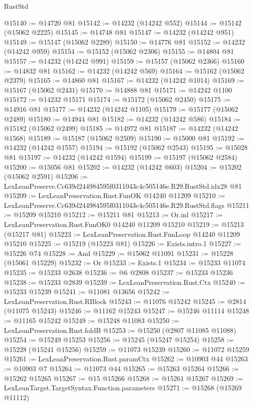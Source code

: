 \begin{lexlean}{RustStd}
\begin{coremodule}
@15140 := @14720 @81
@15142 := @14232 (@14242 @552)
@15144 := @15142 (@15062 @2225)
@15145 := @14748 @81
@15147 := @14232 (@14242 @951)
@15149 := @15147 (@15062 @2289)
@15150 := @14776 @81
@15152 := @14232 (@14242 @959)
@15154 := @15152 (@15062 @2306)
@15155 := @14804 @81
@15157 := @14232 (@14242 @991)
@15159 := @15157 (@15062 @2366)
@15160 := @14832 @81
@15162 := @14232 (@14242 @569)
@15164 := @15162 (@15062 @2379)
@15165 := @14860 @81
@15167 := @14232 (@14242 @1014)
@15169 := @15167 (@15062 @2431)
@15170 := @14888 @81
@15171 := @14242 @1100
@15172 := @14232 @15171
@15174 := @15172 (@15062 @2450)
@15175 := @14916 @81
@15177 := @14232 (@14242 @1105)
@15179 := @15177 (@15062 @2489)
@15180 := @14944 @81
@15182 := @14232 (@14242 @586)
@15184 := @15182 (@15062 @2499)
@15185 := @14972 @81
@15187 := @14232 (@14242 @1568)
@15189 := @15187 (@15062 @2509)
@15190 := @15000 @81
@15192 := @14232 (@14242 @1557)
@15194 := @15192 (@15062 @2543)
@15195 := @15028 @81
@15197 := @14232 (@14242 @1594)
@15199 := @15197 (@15062 @2584)
@15200 := @15056 @81
@15202 := @14232 (@14242 @603)
@15204 := @15202 (@15062 @2591)
@15206 := LexLeanPreserve.Cc639d244984595f0311043c4c505146e.R29.RustStd.idx28 @81
@15209 := LexLeanPreservation.Rust.FunOK @14240 @11209
@15210 := LexLeanPreserve.Cc639d244984595f0311043c4c505146e.R29.RustStd.flags
@15211 := @15209 @15210
@15212 := @15211 @81
@15213 := Or.inl
@15217 := LexLeanPreservation.Rust.FunOK0 @14240 @11209 @15210
@15219 := @15213 (@15217 @81)
@15223 := LexLeanPreservation.Rust.FunLoop @14240 @11209 @15210
@15225 := @15219 (@15223 @81)
@15226 := Exists.intro.{1}
@15227 := @15226 @74
@15228 := And
@15229 := @15062 @11091
@15231 := @15228 (@15061 @15229)
@15232 := Or
@15233 := Exists.{1}
@15234 := @15233 @11074
@15235 := @15233 @2638
@15236 := @6 @2808
@15237 := @15233 @15236
@15238 := @15233 @2839
@15239 := LexLeanPreservation.Rust.Ctx
@15240 := @15233 @15239
@15241 := @11081 @13656
@15242 := LexLeanPreservation.Rust.RBlock
@15243 := @11076 @15242
@15245 := @2814 (@11075 @15243)
@15246 := @11162 @15243
@15247 := @15246 @11114
@15248 := @11165 @15242
@15249 := @15248 @11083
@15250 := LexLeanPreservation.Rust.foldB
@15253 := @15250 (@2807 @11085 @11088)
@15254 := @15249 @15253
@15256 := @15245 (@15247 @15254)
@15258 := @15228 (@15241 @15256)
@15259 := @11073 @15239
@15260 := @11072 @15259
@15261 := LexLeanPreservation.Rust.paramCtx
@15262 := @10903 @44
@15263 := @10903 @7
@15264 := @11073 @44
@15265 := @15263 @15264
@15266 := @15262 @15265
@15267 := @15 @15266
@15268 := @15261 @15267
@15269 := LexLeanTarget.TargetSyntax.Function.parameters
@15271 := @15268 (@15269 @11112)

\end{coremodule}
\end{lexlean}
